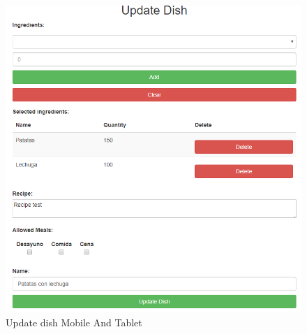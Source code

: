 \documentclass[12pt, a4paper, twoside]{book}
\begin{document}
	\begin{figure}[H]
		\centering
		\includegraphics[width=15cm]{Imagenes/MU-UpdateDishMobileTablet.png}
		\caption{Update dish Mobile And Tablet}\label{Update dish Mobile And Tablet}
	\end{figure}
\end{document}
